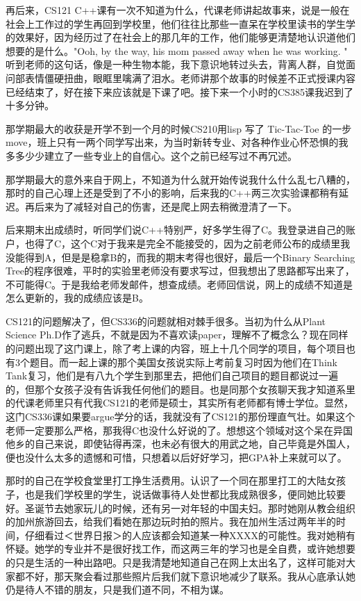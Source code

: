 \documentclass[12pt]{book}
\begin{document}
再后来，CS121 C++课有一次不知道为什么，代课老师讲起故事来，说是一般在社会上工作过的学生再回到学校里，他们往往比那些一直呆在学校里读书的学生学的效果好，因为经历过了在社会上的那几年的工作，他们能够更清楚地认识道他们想要的是什么。"Ooh, by the way, his mom passed away when he was working. " 听到老师的这句话，像是一种生物本能，我下意识地转过头去，背离人群，自觉面问部表情僵硬扭曲，眼眶里噙满了泪水。老师讲那个故事的时候差不正式授课内容已经结束了，好在接下来应该就是下课了吧。接下来一个小时的CS385课我迟到了十多分钟。

那学期最大的收获是开学不到一个月的时候CS210用lisp 写了 Tic-Tac-Toe 的一步move，班上只有一两个同学写出来，为当时新转专业、对各种作业心怀恐惧的我多多少少建立了一些专业上的自信心。这个之前已经写过不再冗述。

那学期最大的意外来自于网上，不知道为什么就开始传说我什么什么乱七八糟的，那时的自己心理上还是受到了不小的影响，后来我的C++两三次实验课都稍有延迟。再后来为了减轻对自己的伤害，还是爬上网去稍微澄清了一下。

后来期末出成绩时，听同学们说C++特别严，好多学生得了C。我登录进自己的账户，也得了C，这个C对于我来是完全不能接受的，因为之前老师公布的成绩里我没能得到A，但是是稳拿B的，而我的期末考得也很好，最后一个Binary Searching Tree的程序很难，平时的实验里老师没有要求写过，但我想出了思路都写出来了，不可能得C。于是我给老师发邮件，想查成绩。老师回信说，网上的成绩不知道是怎么更新的，我的成绩应该是B。

CS121的问题解决了，但CS336的问题就相对棘手很多。当初为什么从Plant Science Ph.D作了逃兵，不就是因为不喜欢读paper，理解不了概念么？现在同样的问题出现了这门课上，除了考上课的内容，班上十几个同学的项目，每个项目也有3个题目。而一起上课的那个美国女孩说实际上考前复习时因为他们在Think Tank复习，他们是有八九个学生到那里去，把他们自己项目的题目都说过一遍的，但那个女孩子没有告诉我任何他们的题目。也是同那个女孩聊天我才知道系里的代课老师里只有代我CS121的老师是硕士，其实所有老师都有博士学位。显然，这门CS336课如果要argue学分的话，我就没有了CS121的那份理直气壮。如果这个老师一定要那么严格，那我得C也没什么好说的了。想想这个领域对这个呆在异国他乡的自己来说，即使钻得再深，也未必有很大的用武之地，自己毕竟是外国人，便也没什么太多的遗憾和可惜，只想着以后好好学习，把GPA补上来就可以了。

那时的自己在学校食堂里打工挣生活费用。认识了一个同在那里打工的大陆女孩子，也是我们学校里的学生，说话做事待人处世都比我成熟很多，便同她比较要好。圣诞节去她家玩儿的时候，还有另一对年轻的中国夫妇。那时她刚从教会组织的加州旅游回去，给我们看她在那边玩时拍的照片。我在加州生活过两年半的时间，仔细看过＜世界日报＞的人应该都会知道某一种XXXX的可能性。我对她稍有怀疑。她学的专业并不是很好找工作，而这两三年的学习也是全自费，或许她想要的只是生活的一种出路吧。只是我清楚地知道自己在网上太出名了，这样可能对大家都不好，那天聚会看过那些照片后我们就下意识地减少了联系。我从心底承认她仍是待人不错的朋友，只是我们道不同，不相为谋。
\end{document}
